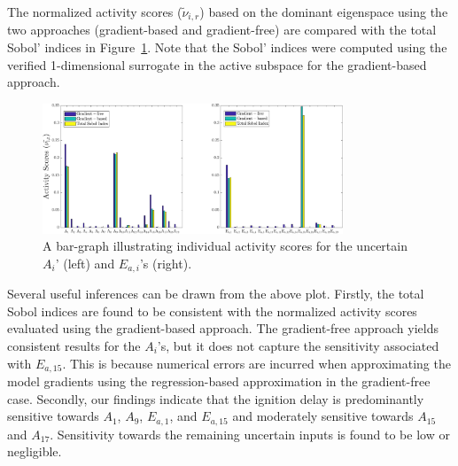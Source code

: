 The normalized activity scores ($\tilde{\nu}_{i,r}$) based on the dominant eigenspace using the two
approaches (gradient-based and gradient-free) are compared with the total Sobol' indices
in Figure~\ref{fig:as_33D}. Note that the Sobol' indices were computed using the verified
1-dimensional surrogate in the active subspace for the gradient-based approach. 
%
\begin{figure}[htbp]
 \begin{center}
  \includegraphics[width=0.8\textwidth]{./Figures/as_33D_new}
\caption{A bar-graph illustrating individual activity scores for the uncertain $A_i$' (left) and $E_{a,i}$'s (right).}
\label{fig:as_33D}
\end{center}
\end{figure}
%
Several useful inferences can be drawn from the above plot. Firstly, the total Sobol indices are found to be
consistent
with the normalized activity scores evaluated using the gradient-based approach. The gradient-free
approach yields consistent results for the $A_i$'s, but it does not capture the sensitivity associated with
$E_{a,15}$. This is because numerical errors are incurred when approximating
the model gradients using the regression-based approximation in the gradient-free case. 
Secondly, our findings indicate that   
the ignition delay is predominantly sensitive towards $A_1$, $A_9$, $E_{a,1}$, and $E_{a,15}$ and 
moderately sensitive towards $A_{15}$ and $A_{17}$. Sensitivity towards the remaining uncertain inputs is
found to be low or negligible. 

